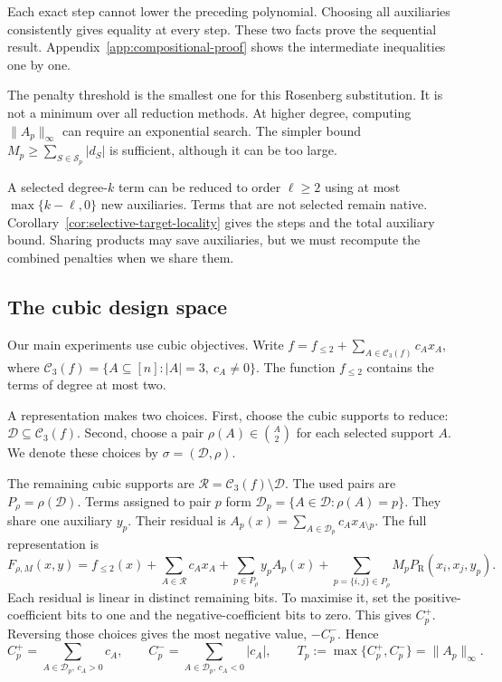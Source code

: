 \documentclass[a4paper,onecolumn,11pt,unpublished]{quantumarticle}
\theoremstyle{remark}
\begin{document}
Each exact step cannot lower the preceding polynomial. Choosing all
auxiliaries consistently gives equality at every step. These two facts
prove the sequential result. Appendix~\ref{app:compositional-proof}
shows the intermediate inequalities one by one.

The penalty threshold is the smallest one for this Rosenberg substitution.
It is not a minimum over all reduction methods. At higher degree, computing
$\|A_p\|_\infty$ can require an exponential search. The simpler bound
$M_p\geq\sum_{S\in\mathcal S_p}|d_S|$ is sufficient, although it can be
too large.

A selected degree-$k$ term can be reduced to order $\ell\geq2$ using at most
$\max\{k-\ell,0\}$ new auxiliaries. Terms that are not selected remain
native. Corollary~\ref{cor:selective-target-locality} gives the steps and
the total auxiliary bound. Sharing products may save auxiliaries, but we
must recompute the combined penalties when we share them.

\subsection{The cubic design space}
\label{sec:cubic-specialisation}

Our main experiments use cubic objectives. Write
$f=f_{\leq2}+\sum_{A\in\mathcal C_3(f)}c_Ax_A$, where
$\mathcal C_3(f)=\{A\subseteq[n]:|A|=3,\ c_A\neq0\}$.
The function $f_{\leq2}$ contains the terms of degree at most two.

A representation makes two choices. First, choose the cubic supports to
reduce: $\mathcal D\subseteq\mathcal C_3(f)$. Second, choose a pair
$\rho(A)\in\binom A2$ for each selected support $A$.
We denote these choices by $\sigma=(\mathcal D,\rho)$.

The remaining cubic supports are
$\mathcal R=\mathcal C_3(f)\setminus\mathcal D$.
The used pairs are $P_\rho=\rho(\mathcal D)$.
Terms assigned to pair $p$ form $\mathcal D_p=\{A\in\mathcal D:\rho(A)=p\}$.
They share one auxiliary $y_p$. Their residual is
$A_p(x)=\sum_{A\in\mathcal D_p}c_Ax_{A\setminus p}$.
The full representation is
\begin{equation}
F_{\rho,M}(x,y)=f_{\leq2}(x)+\sum_{A\in\mathcal R}c_Ax_A
+\sum_{p\in P_\rho}y_pA_p(x)
+\sum_{p=\{i,j\}\in P_\rho}M_pP_{\mathrm R}(x_i,x_j,y_p).
\label{eq:cubic-mixed-objective}
\end{equation}
Each residual is linear in distinct remaining bits. To maximise it, set
the positive-coefficient bits to one and the negative-coefficient bits to
zero. This gives $C_p^+$. Reversing those choices gives the most negative
value, $-C_p^-$. Hence
\begin{equation}
C_p^+=\sum_{A\in\mathcal D_p,\,c_A>0}c_A,\qquad
C_p^-=\sum_{A\in\mathcal D_p,\,c_A<0}|c_A|,\qquad
T_p:=\max\{C_p^+,C_p^-\}=\|A_p\|_\infty.
\label{eq:cubic-threshold}
\end{equation}
\end{document}
